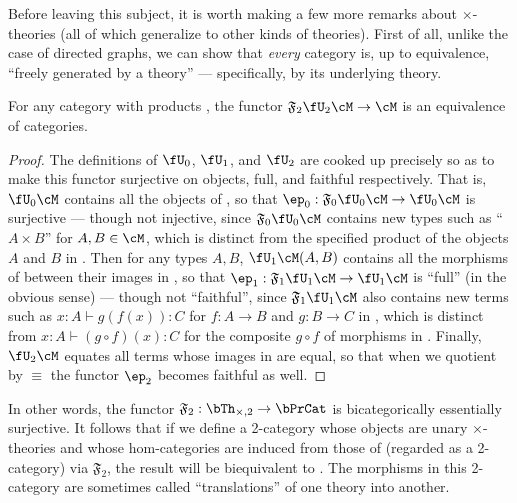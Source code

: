 \documentclass{book}
\let\types\vdash
\newcommand{\F}[1]{\mathfrak{F}_{#1}}
\def\timesthy#1{\bTh_{\times,#1}}
\begin{document}
Before leaving this subject, it is worth making a few more remarks about $\times$-theories (all of which generalize to other kinds of theories).
First of all, unlike the case of directed graphs, we can show that \emph{every} category is, up to equivalence, ``freely generated by a theory'' --- specifically, by its underlying theory.

\begin{thm}\label{thm:catprod-thy-esssurj}
  For any category with products \cM, the functor $\F2\fU_2\cM \to \cM$ is an equivalence of categories.
\end{thm}
\begin{proof}
  The definitions of $\fU_0$, $\fU_1$, and $\fU_2$ are cooked up precisely so as to make this functor surjective on objects, full, and faithful respectively.
  That is, $\fU_0\cM$ contains all the objects of \cM, so that $\ep_0:\F{0}\fU_0\cM\to \fU_0\cM$ is surjective --- though not injective, since $\F{0}\fU_0\cM$ contains new types such as ``$A\times B$'' for $A,B\in \cM$, which is distinct from the specified product of the objects $A$ and $B$ in \cM.
  Then for any types $A,B$, $\fU_1\cM(A,B)$ contains all the morphisms of \cM between their images in \cM, so that $\ep_1:\F{1}\fU_1\cM\to \fU_1\cM$ is ``full'' (in the obvious sense) --- though not ``faithful'', since $\F{1}\fU_1\cM$ also contains new terms such as $x:A\types g(f(x)):C$ for $f:A\to B$ and $g:B\to C$ in \cM, which is distinct from $x:A\types (g\circ f)(x):C$ for the composite $g\circ f$ of morphisms in \cM.
  Finally, $\fU_2\cM$ equates all terms whose images in \cM are equal, so that when we quotient by $\equiv$ the functor $\ep_2$ becomes faithful as well.
\end{proof}

In other words, the functor $\F2:\timesthy2 \to \bPrCat$ is bicategorically essentially surjective.
It follows that if we define a 2-category whose objects are unary $\times$-theories and whose hom-categories are induced from those of \bPrCat (regarded as a 2-category) via $\F2$, the result will be biequivalent to \bPrCat.
The morphisms in this 2-category are sometimes called ``translations'' of one theory into another.
\end{document}
